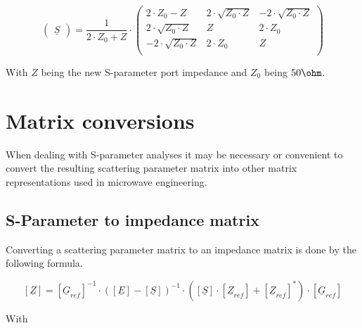 \documentclass[10pt]{report}
\begin{document}
\begin{equation}
\begin{pmatrix}
\underline{S}
\end{pmatrix}
= \dfrac{1}{2\cdot Z_0+Z}\cdot
\begin{pmatrix}
2\cdot Z_0-Z              & 2\cdot\sqrt{Z_0\cdot Z}  & -2\cdot\sqrt{Z_0\cdot Z}\\
2\cdot\sqrt{Z_0\cdot Z}   & Z                        & 2\cdot Z_0\\
-2\cdot\sqrt{Z_0\cdot Z}  & 2\cdot Z_0               & Z\\
\end{pmatrix}
\end{equation}

With $Z$ being the new S-parameter port impedance and $Z_0$ being $50\ohm$.

\section{Matrix conversions}
\label{sec:SparameterConversion}

When dealing with S-parameter analyses it may be necessary or
convenient to convert the resulting scattering parameter matrix into
other matrix representations used in microwave engineering.

\subsection{S-Parameter to impedance matrix}

Converting a scattering parameter matrix to an impedance matrix is
done by the following formula.

\begin{equation}
\left[
\underline{Z}
\right]
=
\left[
\underline{G}_{ref}
\right]^{-1}
\cdot
\left(
\left[\underline{E}\right] - \left[\underline{S}\right]
\right)^{-1}
\cdot
\left(
\left[\underline{S}\right] \cdot \left[\underline{Z}_{ref}\right] + \left[\underline{Z}_{ref}\right]^{*}
\right)
\cdot
\left[\underline{G}_{ref}\right]
\end{equation}

With

\addvspace{12pt}
\end{document}
